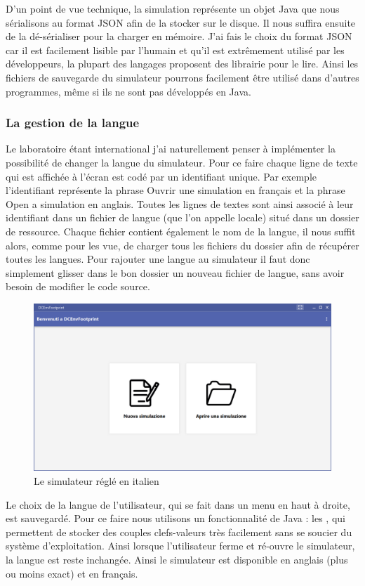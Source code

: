 D'un point de vue technique, la simulation représente un objet Java que nous sérialisons au format JSON afin de la stocker sur le disque. Il nous suffira ensuite de la dé-sérialiser pour la charger en mémoire. J'ai fais le choix du format JSON car il est facilement lisible par l'humain et qu'il est extrêmement utilisé par les développeurs, la plupart des langages proposent des librairie pour le lire. Ainsi les fichiers de sauvegarde du simulateur pourrons facilement être utilisé dans d'autres programmes, même si ils ne sont pas développés en Java.\\

\subsubsection{La gestion de la langue}
Le laboratoire étant international j'ai naturellement penser à implémenter la possibilité de changer la langue du simulateur. Pour ce faire chaque ligne de texte qui est affichée à l'écran est codé par un identifiant unique. Par exemple l'identifiant  représente la phrase \og Ouvrir une simulation \fg{} en français et la phrase \og Open a simulation \fg{} en anglais. Toutes les lignes de textes sont ainsi associé à leur identifiant dans un fichier de langue (que l'on appelle locale) situé dans un dossier de ressource. Chaque fichier contient également le nom de la langue, il nous suffit alors, comme pour les vue, de charger tous les fichiers du dossier afin de récupérer toutes les langues. Pour rajouter une langue au simulateur il faut donc simplement glisser dans le bon dossier un nouveau fichier de langue, sans avoir besoin de modifier le code source.

\begin{figure}[h]
	\begin{center}
		\includegraphics[scale=0.50]{partie2/images/italien.png}
		\caption{Le simulateur réglé en italien}
	\end{center}
\end{figure}
Le choix de la langue de l'utilisateur, qui se fait dans un menu en haut à droite, est sauvegardé. Pour ce faire nous utilisons un fonctionnalité de Java : les , qui permettent de stocker des couples clefs-valeurs très facilement sans se soucier du système d'exploitation. Ainsi lorsque l'utilisateur ferme et ré-ouvre le simulateur, la langue est reste inchangée. Ainsi le simulateur est disponible en anglais (plus ou moins exact) et en français.


